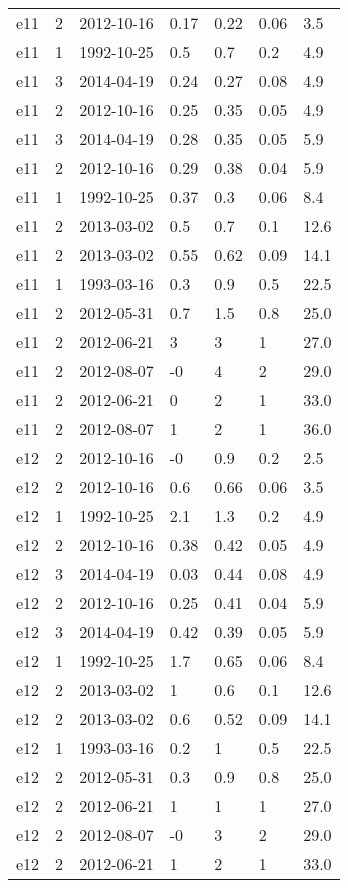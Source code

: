 \begin{table*}[htp]
\begin{tabular}{llll}
e11 & 2 & 2012-10-16 & 0.17 & 0.22 & 0.06 & 3.5 \\
e11 & 1 & 1992-10-25 & 0.5 & 0.7 & 0.2 & 4.9 \\
e11 & 3 & 2014-04-19 & 0.24 & 0.27 & 0.08 & 4.9 \\
e11 & 2 & 2012-10-16 & 0.25 & 0.35 & 0.05 & 4.9 \\
e11 & 3 & 2014-04-19 & 0.28 & 0.35 & 0.05 & 5.9 \\
e11 & 2 & 2012-10-16 & 0.29 & 0.38 & 0.04 & 5.9 \\
e11 & 1 & 1992-10-25 & 0.37 & 0.3 & 0.06 & 8.4 \\
e11 & 2 & 2013-03-02 & 0.5 & 0.7 & 0.1 & 12.6 \\
e11 & 2 & 2013-03-02 & 0.55 & 0.62 & 0.09 & 14.1 \\
e11 & 1 & 1993-03-16 & 0.3 & 0.9 & 0.5 & 22.5 \\
e11 & 2 & 2012-05-31 & 0.7 & 1.5 & 0.8 & 25.0 \\
e11 & 2 & 2012-06-21 & 3 & 3 & 1 & 27.0 \\
e11 & 2 & 2012-08-07 & -0 & 4 & 2 & 29.0 \\
e11 & 2 & 2012-06-21 & 0 & 2 & 1 & 33.0 \\
e11 & 2 & 2012-08-07 & 1 & 2 & 1 & 36.0 \\
e12 & 2 & 2012-10-16 & -0 & 0.9 & 0.2 & 2.5 \\
e12 & 2 & 2012-10-16 & 0.6 & 0.66 & 0.06 & 3.5 \\
e12 & 1 & 1992-10-25 & 2.1 & 1.3 & 0.2 & 4.9 \\
e12 & 2 & 2012-10-16 & 0.38 & 0.42 & 0.05 & 4.9 \\
e12 & 3 & 2014-04-19 & 0.03 & 0.44 & 0.08 & 4.9 \\
e12 & 2 & 2012-10-16 & 0.25 & 0.41 & 0.04 & 5.9 \\
e12 & 3 & 2014-04-19 & 0.42 & 0.39 & 0.05 & 5.9 \\
e12 & 1 & 1992-10-25 & 1.7 & 0.65 & 0.06 & 8.4 \\
e12 & 2 & 2013-03-02 & 1 & 0.6 & 0.1 & 12.6 \\
e12 & 2 & 2013-03-02 & 0.6 & 0.52 & 0.09 & 14.1 \\
e12 & 1 & 1993-03-16 & 0.2 & 1 & 0.5 & 22.5 \\
e12 & 2 & 2012-05-31 & 0.3 & 0.9 & 0.8 & 25.0 \\
e12 & 2 & 2012-06-21 & 1 & 1 & 1 & 27.0 \\
e12 & 2 & 2012-08-07 & -0 & 3 & 2 & 29.0 \\
e12 & 2 & 2012-06-21 & 1 & 2 & 1 & 33.0 \\

\end{tabular}
\end{table*}
